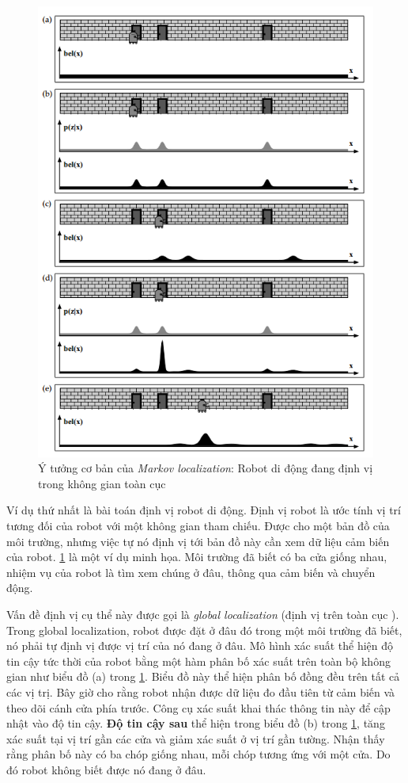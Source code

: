 \begin{figure}[htbp]
  \centering
  \includegraphics[width=0.8\linewidth]{figures/markovLocalization.png}
  \caption{Ý tưởng cơ bản của \textit{Markov localization}: Robot di động đang định vị trong không gian toàn cục \cite{thrun2005probabilistic}}
  \label{fig:markovLocalization}
\end{figure}

Ví dụ thứ nhất là bài toán định vị robot di động. Định vị robot là ước tính vị trí tương đối của robot với một không gian tham chiếu. Được cho một bản đồ của môi trường, nhưng việc tự nó định vị tới bản đồ này cần xem dữ liệu cảm biến của robot. \figurename{\ref{fig:markovLocalization}} là một ví dụ minh họa. Môi trường đã biết có ba cửa giống nhau, nhiệm vụ của robot là tìm xem chúng ở đâu, thông qua cảm biến và chuyển động.

Vấn đề định vị cụ thể này được gọi là \textit{global localization} (định vị trên toàn cục ). Trong global localization, robot được đặt ở đâu đó trong một môi trường đã biết, nó phải tự định vị được vị trí của nó đang ở đâu. Mô hình xác suất thể hiện độ tin cậy tức thời của robot bằng một hàm phân bố xác suất trên toàn bộ không gian như biểu đồ (a) trong \figurename{\ref{fig:markovLocalization}}. Biểu đồ này thể hiện phân bố đồng đều trên tất cả các vị trị. Bây giờ cho rằng robot nhận được dữ liệu đo đầu tiên từ cảm biến và theo dõi cánh cửa phía trước. Công cụ xác suất khai thác thông tin này để cập nhật vào độ tin cậy.
\textbf{Độ tin cậy sau} 
thể hiện trong biểu đồ (b) trong \figurename{\ref{fig:markovLocalization}}, tăng xác suất tại vị trí gần các cửa và giảm xác suất ở vị trí gần tường. 
Nhận thấy rằng phân bố này có ba chóp giống nhau, mỗi chóp tương ứng với một cửa. Do đó robot không biết được nó đang ở đâu. 

